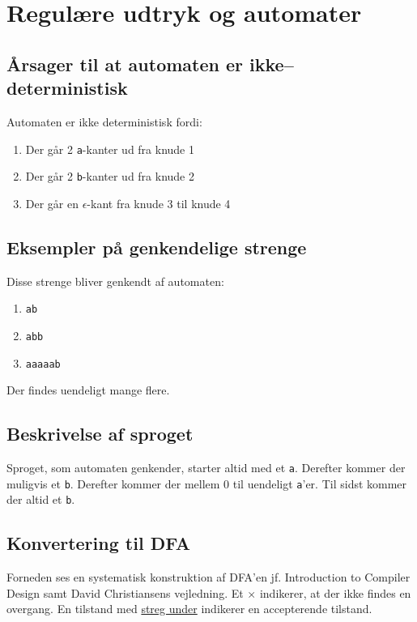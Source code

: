 \section{Regulære udtryk og automater}

\subsection{Årsager til at automaten er ikke–deterministisk}

Automaten er ikke deterministisk fordi:

\begin{enumerate}
    \item Der går 2 \texttt{a}-kanter ud fra knude 1
    \item Der går 2 \texttt{b}-kanter ud fra knude 2
    \item Der går en $\epsilon$-kant fra knude 3 til knude 4
\end{enumerate}

\subsection{Eksempler på genkendelige strenge}

Disse strenge bliver genkendt af automaten:

\begin{enumerate}
    \item \texttt{ab}
    \item \texttt{abb}
    \item \texttt{aaaaab}
\end{enumerate}

Der findes uendeligt mange flere.

\subsection{Beskrivelse af sproget}

Sproget, som automaten genkender, starter altid med et \texttt{a}. Derefter kommer der muligvis et \texttt{b}. Derefter kommer der mellem 0 til uendeligt \texttt{a}'er. Til sidst kommer der altid et \texttt{b}.

\subsection{Konvertering til DFA}

Forneden ses en systematisk konstruktion af DFA'en jf. Introduction to Compiler Design samt David Christiansens vejledning. Et $\times$ indikerer, at der ikke findes en overgang. En tilstand med \underline{streg under} indikerer en accepterende tilstand.

